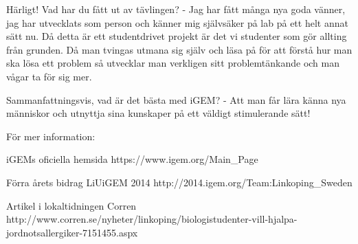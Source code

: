 Härligt! Vad har du fått ut av tävlingen?
- Jag har fått många nya goda vänner, jag har utvecklats som person och känner mig självsäker på lab på ett helt annat sätt nu. Då detta är ett studentdrivet projekt är det vi studenter som gör allting från grunden. Då man tvingas utmana sig själv och läsa på för att förstå hur man ska lösa ett problem så utvecklar man verkligen sitt problemtänkande och man vågar ta för sig mer.

Sammanfattningsvis, vad är det bästa med iGEM?
- Att man får lära känna nya människor och utnyttja sina kunskaper på ett väldigt stimulerande sätt!



För mer information:

iGEMs oficiella hemsida
https://www.igem.org/Main_Page

Förra årets bidrag LiUiGEM 2014
http://2014.igem.org/Team:Linkoping_Sweden

Artikel i lokaltidningen Corren
http://www.corren.se/nyheter/linkoping/biologistudenter-vill-hjalpa-jordnotsallergiker-7151455.aspx
